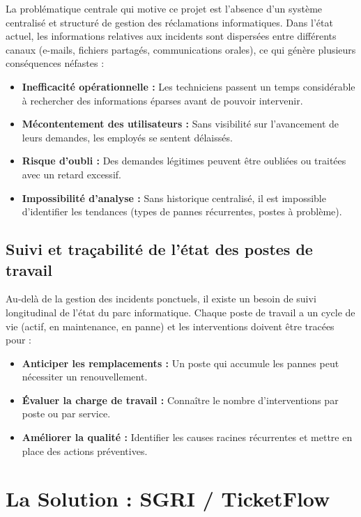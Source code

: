 \documentclass[12pt,a4paper,twoside]{report}
\begin{document}
La problématique centrale qui motive ce projet est l'absence d'un système centralisé et structuré de gestion des réclamations informatiques. Dans l'état actuel, les informations relatives aux incidents sont dispersées entre différents canaux (e-mails, fichiers partagés, communications orales), ce qui génère plusieurs conséquences néfastes :

\begin{itemize}
    \item \textbf{Inefficacité opérationnelle :} Les techniciens passent un temps considérable à rechercher des informations éparses avant de pouvoir intervenir.
    \item \textbf{Mécontentement des utilisateurs :} Sans visibilité sur l'avancement de leurs demandes, les employés se sentent délaissés.
    \item \textbf{Risque d'oubli :} Des demandes légitimes peuvent être oubliées ou traitées avec un retard excessif.
    \item \textbf{Impossibilité d'analyse :} Sans historique centralisé, il est impossible d'identifier les tendances (types de pannes récurrentes, postes à problème).
\end{itemize}

\subsection{Suivi et traçabilité de l'état des postes de travail}

Au-delà de la gestion des incidents ponctuels, il existe un besoin de suivi longitudinal de l'état du parc informatique. Chaque poste de travail a un cycle de vie (actif, en maintenance, en panne) et les interventions doivent être tracées pour :

\begin{itemize}
    \item \textbf{Anticiper les remplacements :} Un poste qui accumule les pannes peut nécessiter un renouvellement.
    \item \textbf{Évaluer la charge de travail :} Connaître le nombre d'interventions par poste ou par service.
    \item \textbf{Améliorer la qualité :} Identifier les causes racines récurrentes et mettre en place des actions préventives.
\end{itemize}

\section{La Solution : SGRI / TicketFlow}
\end{document}
